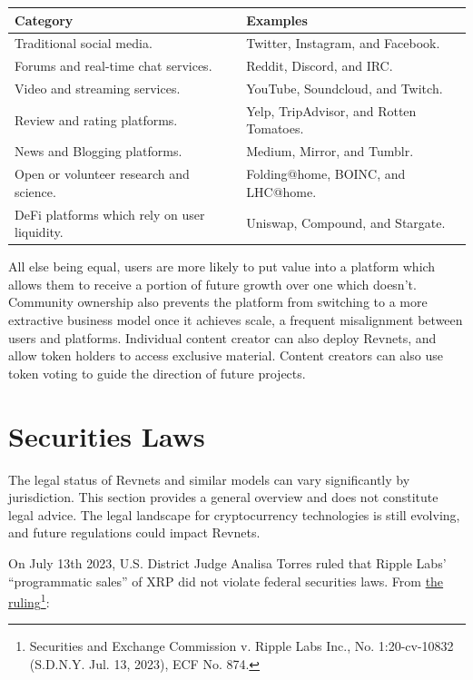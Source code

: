 \documentclass{article}
\begin{document}
\begin{table}[h]
  \centering
  \begin{tabular}{|l|l|}
    \hline \textbf{Category} & \textbf{Examples} \\
    \hline Traditional social media. & Twitter, Instagram, and Facebook. \\
    \hline Forums and real-time chat services. & Reddit, Discord, and IRC. \\
    \hline Video and streaming services. & YouTube, Soundcloud, and Twitch. \\
    \hline Review and rating platforms. & Yelp, TripAdvisor, and Rotten Tomatoes. \\
    \hline News and Blogging platforms. & Medium, Mirror, and Tumblr. \\
    \hline Open or volunteer research and science. & Folding@home, BOINC, and LHC@home. \\
    \hline DeFi platforms which rely on user liquidity. & Uniswap, Compound, and Stargate. \\
    \hline
  \end{tabular}
\end{table}

All else being equal, users are more likely to put value into a platform which allows them to receive a portion of future growth over one which doesn't. Community ownership also prevents the platform from switching to a more extractive business model once it achieves scale, a frequent misalignment between users and platforms. Individual content creator can also deploy Revnets, and allow token holders to access exclusive material. Content creators can also use token voting to guide the direction of future projects.

\section{Securities Laws}

The legal status of Revnets and similar models can vary significantly by jurisdiction. This section provides a general overview and does not constitute legal advice. The legal landscape for cryptocurrency technologies is still evolving, and future regulations could impact Revnets.

On July 13th 2023, U.S. District Judge Analisa Torres ruled that Ripple Labs' ``programmatic sales'' of XRP did not violate federal securities laws. From \href{https://storage.courtlistener.com/recap/gov.uscourts.nysd.551082/gov.uscourts.nysd.551082.874.0_5.pdf}{the ruling}\footnote{Securities and Exchange Commission v. Ripple Labs Inc., No. 1:20-cv-10832 (S.D.N.Y. Jul. 13, 2023), ECF No. 874.}:
\end{document}
